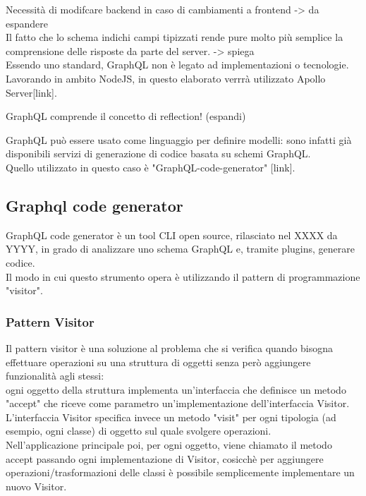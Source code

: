 \documentclass[a4paper, 12pt]{scrartcl}
\begin{document}
      Necessità di modifcare backend in caso di cambiamenti a frontend -> da espandere \\
      Il fatto che lo schema indichi campi tipizzati rende pure molto più semplice la comprensione delle risposte da parte del server. -> spiega \\

      Essendo uno standard, GraphQL non è legato ad implementazioni o tecnologie. Lavorando in ambito NodeJS, in questo elaborato verrrà utilizzato Apollo Server[link].

      GraphQL comprende il concetto di reflection! (espandi)

      GraphQL può essere usato come linguaggio per definire modelli: sono infatti già disponibili servizi di generazione di codice basata su schemi GraphQL.\\
      Quello utilizzato in questo caso è "GraphQL-code-generator" [link].

    \subsection*{Graphql code generator}
      GraphQL code generator è un tool CLI open source, rilasciato nel XXXX da YYYY, in grado di analizzare uno schema GraphQL e, tramite plugins, generare codice.\\
      Il modo in cui questo strumento opera è utilizzando il pattern di programmazione "visitor".
      \subsubsection*{Pattern Visitor}
        Il pattern visitor è una soluzione al problema che si verifica quando bisogna effettuare operazioni su una struttura di oggetti senza però aggiungere funzionalità agli stessi:\\
        ogni oggetto della struttura implementa un'interfaccia che definisce un metodo "accept" che riceve come parametro un'implementazione dell'interfaccia Visitor.\\
        L'interfaccia Visitor specifica invece un metodo "visit" per ogni tipologia (ad esempio, ogni classe) di oggetto sul quale svolgere operazioni.\\
        Nell'applicazione principale poi, per ogni oggetto, viene chiamato il metodo accept passando ogni implementazione di Visitor, cosicchè per aggiungere operazioni/trasformazioni delle classi è possibile semplicemente implementare un nuovo Visitor.\\
\end{document}
